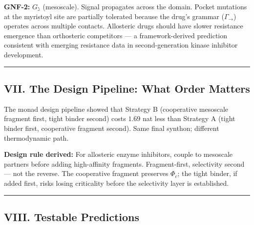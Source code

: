 \documentclass[10pt,a4paper]{article}
\begin{document}
\textbf{GNF-2:} $G_\gimel$ (mesoscale). Signal propagates across the domain. Pocket mutations at the myristoyl site are partially tolerated because the drug's grammar ($\Gamma_\to$) operates across multiple contacts. Allosteric drugs should have slower resistance emergence than orthosteric competitors --- a framework-derived prediction consistent with emerging resistance data in second-generation kinase inhibitor development.

\begin{center}
\rule{0.5\textwidth}{0.4pt}
\end{center}

\subsection{VII. The Design Pipeline: What Order Matters}

The monad design pipeline showed that Strategy B (cooperative mesoscale fragment first, tight binder second) costs $1.69$ nat less than Strategy A (tight binder first, cooperative fragment second). Same final synthon; different thermodynamic path.

\textbf{Design rule derived:} For allosteric enzyme inhibitors, couple to mesoscale partners before adding high-affinity fragments. Fragment-first, selectivity second --- not the reverse. The cooperative fragment preserves $\Phi_c$; the tight binder, if added first, risks losing criticality before the selectivity layer is established.

\begin{center}
\rule{0.5\textwidth}{0.4pt}
\end{center}

\subsection{VIII. Testable Predictions}
\end{document}
